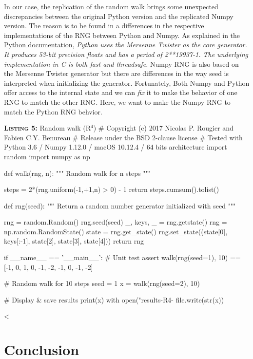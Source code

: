 \documentclass[a4paper,11pt]{article}
\begin{document}
In our case, the replication of the random walk brings some unexpected discrepancies between the original Python version and the replicated Numpy version.
The reason is to be found in a differences in the respective implementations of the RNG between Python and Numpy.
As explained in the \href{https://docs.python.org/3.6/library/random.html}{Python documentation}, {\em Python uses the Mersenne Twister as the core generator. It produces 53-bit precision floats
and has a period of 2**19937-1.
The underlying implementation in C is both fast and threadsafe.}
Numpy RNG is also based on the Mersenne Twister generator but there are differences in the way seed is interpreted when initializing the generator.
Fortunately, Both Numpy and Python offer access to the internal state and we can {\em fix} it to make the behavior of one RNG to match the other RNG.
Here, we want to make the Numpy RNG to match the Python RNG behvior.

\begin{code}{\textbf{\textsc{Listing 5:}} Random walk (R$^4$)}
# Copyright (c) 2017 Nicolas P. Rougier and Fabien C.Y. Benureau
# Release under the BSD 2-clause license
# Tested with Python 3.6 / Numpy 1.12.0 / macOS 10.12.4 / 64 bits architecture
import random
import numpy as np

def walk(rng, n):
    """ Random walk for n steps """

    steps = 2*(rng.uniform(-1,+1,n) > 0) - 1
    return steps.cumsum().tolist()

def rng(seed):
    """ Return a random number generator initialized with seed """ 
    
    rng = random.Random()
    rng.seed(seed)
    _, keys, _ = rng.getstate()
    rng = np.random.RandomState()
    state = rng.get_state()
    rng.set_state((state[0], keys[:-1], state[2], state[3], state[4]))
    return rng

if __name__ == '__main__':
    # Unit test
    assert walk(rng(seed=1), 10) == [-1, 0, 1, 0, -1, -2, -1, 0, -1, -2]

    # Random walk for 10 steps
    seed = 1
    x = walk(rng(seed=2), 10)

    # Display & save results
    print(x)
    with open("results-R4-%
        file.write(str(x))
\end{code}

<

\clearpage
\section*{Conclusion}


\renewcommand*{\bibfont}{\small}
\printbibliography[title=References]
\end{document}
